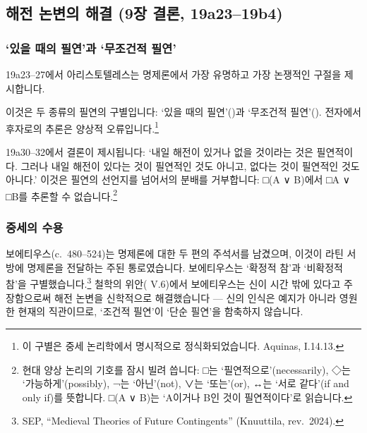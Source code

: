\documentclass[12pt, a4paper]{article}
\begin{document}
\thispagestyle{firstpage}


\subsection{해전 논변의 해결 (9장 결론, 19a23--19b4)}

\subsubsection{`있을 때의 필연'과 `무조건적 필연'}

19a23--27에서 아리스토텔레스는 명제론에서 가장 유명하고 가장 논쟁적인 구절을 제시합니다.


이것은 두 종류의 필연의 구별입니다: `있을 때의 필연'()과 `무조건적 필연'(). 전자에서 후자로의 추론은 양상적 오류입니다.\footnote{이 구별은 중세 논리학에서 명시적으로 정식화되었습니다. Aquinas,  I.14.13.}

19a30--32에서 결론이 제시됩니다: `내일 해전이 있거나 없을 것이라는 것은 필연적이다. 그러나 내일 해전이 있다는 것이 필연적인 것도 아니고, 없다는 것이 필연적인 것도 아니다.' 이것은 필연의 선언지를 넘어서의 분배를 거부합니다: □(A ∨ B)에서 □A ∨ □B를 추론할 수 없습니다.\footnote{현대 양상 논리의 기호를 잠시 빌려 씁니다: □는 `필연적으로'(necessarily), ◇는 `가능하게'(possibly), ¬는 `아닌'(not), ∨는 `또는'(or), ↔는 `서로 같다'(if and only if)를 뜻합니다. □(A ∨ B)는 `A이거나 B인 것이 필연적이다'로 읽습니다.}

\subsubsection{중세의 수용}

보에티우스(c.\ 480--524)는 명제론에 대한 두 편의 주석서를 남겼으며, 이것이 라틴 서방에 명제론을 전달하는 주된 통로였습니다. 보에티우스는 `확정적 참'과 `비확정적 참'을 구별했습니다.\footnote{SEP, ``Medieval Theories of Future Contingents'' (Knuuttila, rev.\ 2024).} 철학의 위안( V.6)에서 보에티우스는 신이 시간 밖에 있다고 주장함으로써 해전 논변을 신학적으로 해결했습니다 --- 신의 인식은 예지가 아니라 영원한 현재의 직관이므로, `조건적 필연'이 `단순 필연'을 함축하지 않습니다.
\end{document}
